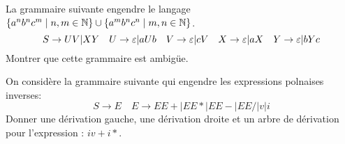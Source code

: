 \documentclass[french]{article}
\begin{document}
\begin{exo}
    La grammaire suivante engendre le langage \(\{a^nb^nc^m\mid n,m\in\mathbb{N}\}\cup
    \{a^mb^nc^n\mid m,n\in\mathbb{N}\}\).
    \[S\to UV|XY \quad U\to\varepsilon|aUb\quad V\to\varepsilon|cV\quad X\to\varepsilon|aX\quad Y\to\varepsilon|bYc\]
    Montrer que cette grammaire est ambigüe.
\end{exo}

\begin{exo}
    On considère la grammaire suivante qui engendre les expressions polnaises inverses:
    \[S\to E\quad E\to EE+|EE*|EE-|EE/|v|i\]
    Donner une dérivation gauche, une dérivation droite et un arbre de dérivation
    pour l'expression : \(iv+i*\).
\end{exo}
\end{document}
